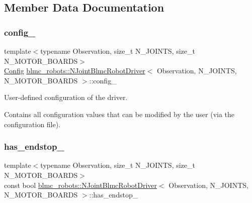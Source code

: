 \subsection{Member Data Documentation}
\mbox{\label{classblmc__robots_1_1NJointBlmcRobotDriver_a5af27a320384e0189725ee1b13edc314}} 
\subsubsection{\texorpdfstring{config\+\_\+}{config\_}}
{\footnotesize\ttfamily template$<$typename Observation, size\+\_\+t N\+\_\+\+J\+O\+I\+N\+TS, size\+\_\+t N\+\_\+\+M\+O\+T\+O\+R\+\_\+\+B\+O\+A\+R\+DS$>$ \\
\hyperlink{structblmc__robots_1_1NJointBlmcRobotDriver_1_1Config}{Config} \hyperlink{classblmc__robots_1_1NJointBlmcRobotDriver}{blmc\+\_\+robots\+::\+N\+Joint\+Blmc\+Robot\+Driver}$<$ Observation, N\+\_\+\+J\+O\+I\+N\+TS, N\+\_\+\+M\+O\+T\+O\+R\+\_\+\+B\+O\+A\+R\+DS $>$\+::config\+\_\+\hspace{0.3cm}{\ttfamily [protected]}}



User-\/defined configuration of the driver. 

Contains all configuration values that can be modified by the user (via the configuration file). \mbox{\label{classblmc__robots_1_1NJointBlmcRobotDriver_a584b85a9e8356e4afcdf1559edd700cc}} 
\subsubsection{\texorpdfstring{has\+\_\+endstop\+\_\+}{has\_endstop\_}}
{\footnotesize\ttfamily template$<$typename Observation, size\+\_\+t N\+\_\+\+J\+O\+I\+N\+TS, size\+\_\+t N\+\_\+\+M\+O\+T\+O\+R\+\_\+\+B\+O\+A\+R\+DS$>$ \\
const bool \hyperlink{classblmc__robots_1_1NJointBlmcRobotDriver}{blmc\+\_\+robots\+::\+N\+Joint\+Blmc\+Robot\+Driver}$<$ Observation, N\+\_\+\+J\+O\+I\+N\+TS, N\+\_\+\+M\+O\+T\+O\+R\+\_\+\+B\+O\+A\+R\+DS $>$\+::has\+\_\+endstop\+\_\+}



